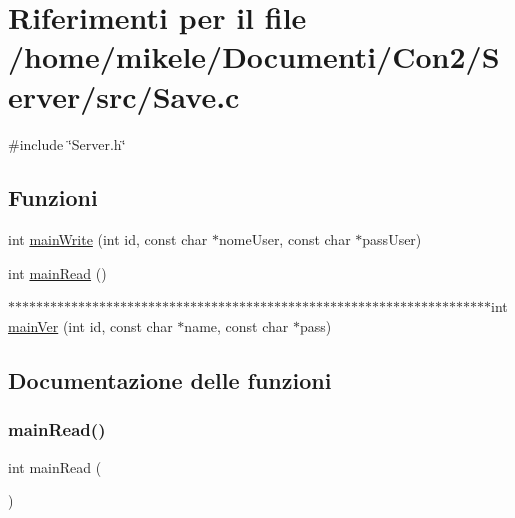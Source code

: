 \hypertarget{a00044}{}\section{Riferimenti per il file /home/mikele/\+Documenti/\+Con2/\+Server/src/\+Save.c}
\label{a00044}
{\ttfamily \#include \char`\"{}Server.\+h\char`\"{}}\newline
\subsection*{Funzioni}
\begin{DoxyCompactItemize}
\item 
int \mbox{\hyperlink{a00044_a686fdc51e62cecfde609bd7635ac4b4b}{main\+Write}} (int id, const char $\ast$nome\+User, const char $\ast$pass\+User)
\item 
int \mbox{\hyperlink{a00044_ac5c53a5bcea0e6648c6564f0b5f5b6bd}{main\+Read}} ()
\item 
$\ast$$\ast$$\ast$$\ast$$\ast$$\ast$$\ast$$\ast$$\ast$$\ast$$\ast$$\ast$$\ast$$\ast$$\ast$$\ast$$\ast$$\ast$$\ast$$\ast$$\ast$$\ast$$\ast$$\ast$$\ast$$\ast$$\ast$$\ast$$\ast$$\ast$$\ast$$\ast$$\ast$$\ast$$\ast$$\ast$$\ast$$\ast$$\ast$$\ast$$\ast$$\ast$$\ast$$\ast$$\ast$$\ast$$\ast$$\ast$$\ast$$\ast$$\ast$$\ast$$\ast$$\ast$$\ast$$\ast$$\ast$$\ast$$\ast$$\ast$$\ast$$\ast$$\ast$$\ast$$\ast$$\ast$$\ast$$\ast$$\ast$int \mbox{\hyperlink{a00044_ab8031ecce68816277ecffe7667660900}{main\+Ver}} (int id, const char $\ast$name, const char $\ast$pass)
\end{DoxyCompactItemize}


\subsection{Documentazione delle funzioni}
\mbox{\label{a00044_ac5c53a5bcea0e6648c6564f0b5f5b6bd}} 
\subsubsection{\texorpdfstring{mainRead()}{mainRead()}}
{\footnotesize\ttfamily int main\+Read (\begin{DoxyParamCaption}{ }\end{DoxyParamCaption})}



